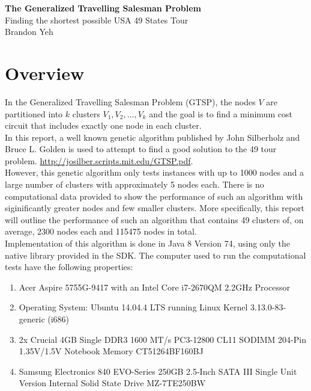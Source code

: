 \documentclass[12pt]{article}
\begin{document}
\begin{center}
\textbf{\LARGE The Generalized Travelling Salesman Problem}\\
\Large Finding the shortest possible USA 49 States Tour\\

\large Brandon Yeh\\
\end{center}

\newpage

\section{Overview}

In the Generalized Travelling Salesman Problem (GTSP), the nodes $V$ are partitioned into $k$ clusters $V_1,V_2,...,V_k$ and the goal is to find a minimum cost circuit that includes exactly one node in each cluster.\\

In this report, a well known genetic algorithm published by John Silberholz and Bruce L. Golden is used to attempt to find a good solution to the 49 tour problem. \url{http://josilber.scripts.mit.edu/GTSP.pdf}.\\

However, this genetic algorithm only tests instances with up to 1000 nodes and a large number of clusters with approximately 5 nodes each. There is no computational data provided to show the performance of such an algorithm with siginificantly greater nodes and few smaller clusters. More specifically, this report will outline the performance of such an algorithm that contains 49 clusters of, on average, 2300 nodes each and 115475 nodes in total.\\

Implementation of this algorithm is done in Java 8 Version 74, using only the native library provided in the SDK. The computer used to run the computational tests have the following properties:
\begin{enumerate}
  \item Acer Aspire 5755G-9417 with an Intel Core i7-2670QM 2.2GHz Processor
  \item Operating System: Ubuntu 14.04.4 LTS running Linux Kernel 3.13.0-83-generic (i686)
  \item 2x Crucial 4GB Single DDR3 1600 MT/s PC3-12800 CL11 SODIMM 204-Pin 1.35V/1.5V Notebook Memory CT51264BF160BJ 
  \item Samsung Electronics 840 EVO-Series 250GB 2.5-Inch SATA III Single Unit Version Internal Solid State Drive MZ-7TE250BW 
\end{enumerate}
\end{document}
